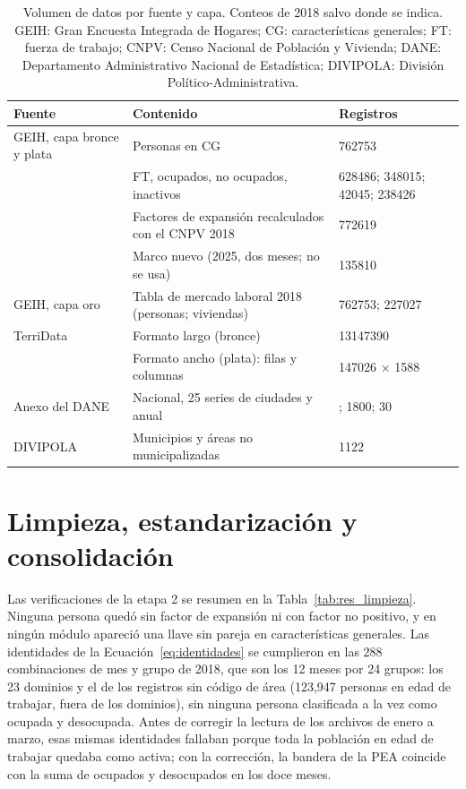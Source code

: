\begin{table}[!htbp]
\centering
\small
\caption{Volumen de datos por fuente y capa. Conteos de 2018 salvo donde se indica. GEIH: Gran Encuesta Integrada de Hogares; CG: características generales; FT: fuerza de trabajo; CNPV: Censo Nacional de Población y Vivienda; DANE: Departamento Administrativo Nacional de Estadística; DIVIPOLA: División Político-Administrativa.}
\label{tab:res_obtencion}
\begin{tabularx}{\linewidth}{>{\raggedright\arraybackslash}p{3.0cm} >{\raggedright\arraybackslash}X >{\raggedleft\arraybackslash}p{3.2cm}}
\toprule
Fuente & Contenido & Registros \\
\midrule
GEIH, capa bronce y plata & Personas en CG & \num{762753} \\
 & FT, ocupados, no ocupados, inactivos & \num{628486}; \num{348015}; \num{42045}; \num{238426} \\
 & Factores de expansión recalculados con el CNPV 2018 & \num{772619} \\
 & Marco nuevo (2025, dos meses; no se usa) & \num{135810} \\
GEIH, capa oro & Tabla de mercado laboral 2018 (personas; viviendas) & \num{762753}; \num{227027} \\
TerriData & Formato largo (bronce) & \num{13147390} \\
 & Formato ancho (plata): filas y columnas & \num{147026} $\times$ \num{1588} \\
Anexo del DANE & Nacional, 25 series de ciudades y anual & 72; \num{1800}; 30 \\
DIVIPOLA & Municipios y áreas no municipalizadas & \num{1122} \\
\bottomrule
\end{tabularx}
\end{table}

\section{Limpieza, estandarización y consolidación}
\label{sec:res_limpieza}

Las verificaciones de la etapa 2 se resumen en la Tabla~\ref{tab:res_limpieza}. Ninguna persona quedó sin factor de expansión ni con factor no positivo, y en ningún módulo apareció una llave sin pareja en características generales. Las identidades de la Ecuación~\ref{eq:identidades} se cumplieron en las 288 combinaciones de mes y grupo de 2018, que son los 12 meses por 24 grupos: los 23 dominios y el de los registros sin código de área (123,947 personas en edad de trabajar, fuera de los dominios), sin ninguna persona clasificada a la vez como ocupada y desocupada. Antes de corregir la lectura de los archivos de enero a marzo, esas mismas identidades fallaban porque toda la población en edad de trabajar quedaba como activa; con la corrección, la bandera de la PEA coincide con la suma de ocupados y desocupados en los doce meses.

